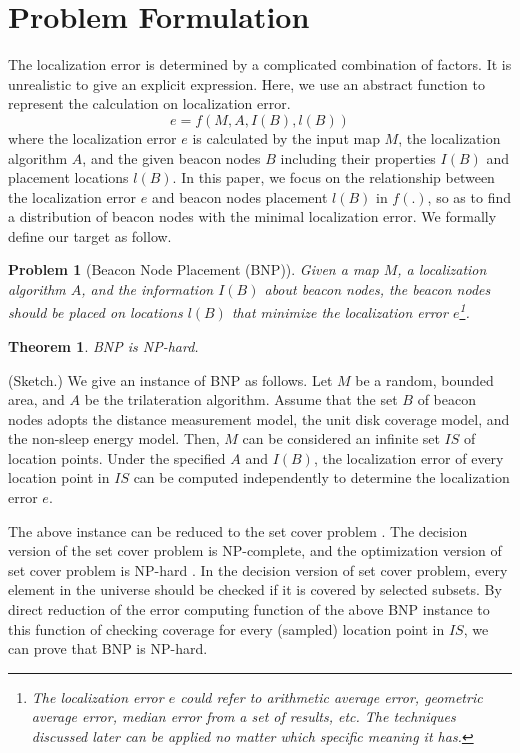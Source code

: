 \documentclass[10pt, conference, letterpaper]{IEEEtran}
\newtheorem{thm}{Theorem}
\newtheorem{prob}{Problem}
\begin{document}
\section{Problem Formulation} \label{formulation}

The localization error is determined by a complicated combination of factors. It is unrealistic to give an explicit expression. Here, we use an abstract function to represent the calculation on localization error.
\begin{equation} \label{e_f}
e=f(M,A,I(B),l(B))
\end{equation}
where the localization error $e$ is calculated by the input map $M$, the localization algorithm $A$, and the given beacon nodes $B$ including their properties $I(B)$ and placement locations $l(B)$. In this paper, we focus on the relationship between the localization error $e$ and beacon nodes placement $l(B)$ in $f(.)$, so as to find a distribution of beacon nodes with the minimal localization error. We formally define our target as follow.

\begin{prob} [Beacon Node Placement (BNP)]
Given a map $M$, a localization algorithm $A$, and the information $I(B)$ about beacon nodes, the beacon nodes should be placed on locations $l(B)$ that minimize the localization error $e$\footnote{The localization error $e$ could refer to arithmetic average error, geometric average error, median error from a set of results, etc. The techniques discussed later can be applied no matter which specific meaning it has.}.
\end{prob}

\begin{thm}
BNP is NP-hard.
\end{thm}
\begin{IEEEproof}
(Sketch.) We give an instance of BNP as follows. Let $M$ be a random, bounded area, and $A$ be the trilateration algorithm. Assume that the set $B$ of beacon nodes adopts the distance measurement model, the unit disk coverage model, and the non-sleep energy model. Then, $M$ can be considered an infinite set $IS$ of location points. Under the specified $A$ and $I(B)$, the localization error of every location point in $IS$ can be computed independently to determine the localization error $e$.

The above instance can be reduced to the set cover problem \cite{karp72}. The decision version of the set cover problem is NP-complete, and the optimization version of set cover problem is NP-hard \cite{korte12}. In the decision version of set cover problem, every element in the universe should be checked if it is covered by selected subsets. By direct reduction of the error computing function of the above BNP instance to this function of checking coverage for every (sampled) location point in $IS$, we can prove that BNP is NP-hard.
\end{IEEEproof}
\end{document}
